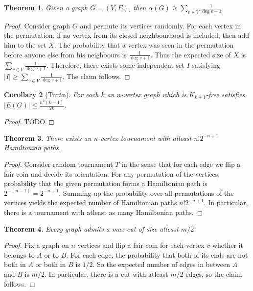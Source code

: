 \documentclass{article}
\theoremstyle{plain}
\newtheorem{thm}{Theorem}[section]
\newtheorem{dus}[thm]{Corollary}
\theoremstyle{definition}
\begin{document}
\begin{thm}\label{thm:is_rand}
	Given a graph $G=(V,E)$, then $\alpha(G)\geq \sum_{v\in V}\frac{1}{\deg v + 1}$
\end{thm}
\begin{proof}
	Consider graph $G$ and permute its vertices randomly. For each vertex in the permutation, if no vertex from its closed neighbourhood is included, then add him to the set $X$. The probability that a vertex was seen in the permutation before anyone else from his neighbours is $\frac{1}{\deg v + 1}$. Thus the expected size of $X$ is $\sum_{v\in V}\frac{1}{\deg v + 1}$. Therefore, there exists some independent set $I$ satisfying $|I|\geq \sum_{v\in V}\frac{1}{\deg v + 1}$. The claim follows.
\end{proof}


\begin{dus}[Turán]
	For each $k$ an $n$-vertex graph which is $K_{k+1}$-free satisfies $|E(G)|\leq \frac{n^2(k-1)}{2k}$.
\end{dus}
\begin{proof}
	TODO
\end{proof}

\begin{thm}
	There exists an $n$-vertex tournament with atleast $n!2^{-n+1}$ Hamiltonian paths.
\end{thm}
\begin{proof}
	Consider random tournament $T$ in the sense that for each edge we flip a fair coin and decide its orientation. For any permutation of the vertices, probability that the given permutation forms a Hamiltonian path is $2^{-(n-1)}=2^{-n+1}$. Summing up the probability over all permutations of the vertices yields the expected number of Hamiltonian paths $n!2^{-n+1}$. In particular, there is a tournament with atleast as many Hamiltonian paths.
\end{proof}


\begin{thm}\label{thm:maxcut_prob}
	Every graph admits a max-cut of size atleast $m/2$.
\end{thm}
\begin{proof}
	Fix a graph on $n$ vertices and flip a fair coin for each vertex $v$ whether it belongs to $A$ or to $B$. For each edge, the probability that both of its ends are not both in $A$ or both in $B$ is $1/2$. So the expected number of edges in between $A$ and $B$ is $m/2$. In particular, there is a cut with atleast $m/2$ edges, so the claim follows. 
\end{proof}
\end{document}
